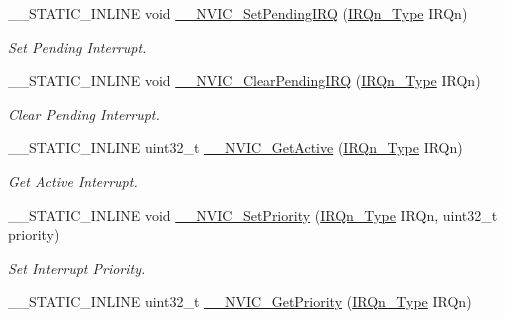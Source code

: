 \begin{DoxyCompactItemize}
\+\_\+\+\_\+\+S\+T\+A\+T\+I\+C\+\_\+\+I\+N\+L\+I\+NE void \hyperlink{group___c_m_s_i_s___core___n_v_i_c_functions_gaabefdd4b790b9a7308929938c0c1e1ad}{\+\_\+\+\_\+\+N\+V\+I\+C\+\_\+\+Set\+Pending\+I\+RQ} (\hyperlink{group___peripheral__interrupt__number__definition_ga7e1129cd8a196f4284d41db3e82ad5c8}{I\+R\+Qn\+\_\+\+Type} I\+R\+Qn)
\begin{DoxyCompactList}\small\item\em Set Pending Interrupt. \end{DoxyCompactList}\item 
\+\_\+\+\_\+\+S\+T\+A\+T\+I\+C\+\_\+\+I\+N\+L\+I\+NE void \hyperlink{group___c_m_s_i_s___core___n_v_i_c_functions_ga562a86dbdf14827d0fee8fdafb04d191}{\+\_\+\+\_\+\+N\+V\+I\+C\+\_\+\+Clear\+Pending\+I\+RQ} (\hyperlink{group___peripheral__interrupt__number__definition_ga7e1129cd8a196f4284d41db3e82ad5c8}{I\+R\+Qn\+\_\+\+Type} I\+R\+Qn)
\begin{DoxyCompactList}\small\item\em Clear Pending Interrupt. \end{DoxyCompactList}\item 
\+\_\+\+\_\+\+S\+T\+A\+T\+I\+C\+\_\+\+I\+N\+L\+I\+NE uint32\+\_\+t \hyperlink{group___c_m_s_i_s___core___n_v_i_c_functions_gaa2837003c28c45abf193fe5e8d27f593}{\+\_\+\+\_\+\+N\+V\+I\+C\+\_\+\+Get\+Active} (\hyperlink{group___peripheral__interrupt__number__definition_ga7e1129cd8a196f4284d41db3e82ad5c8}{I\+R\+Qn\+\_\+\+Type} I\+R\+Qn)
\begin{DoxyCompactList}\small\item\em Get Active Interrupt. \end{DoxyCompactList}\item 
\+\_\+\+\_\+\+S\+T\+A\+T\+I\+C\+\_\+\+I\+N\+L\+I\+NE void \hyperlink{group___c_m_s_i_s___core___n_v_i_c_functions_ga505338e23563a9c074910fb14e7d45fd}{\+\_\+\+\_\+\+N\+V\+I\+C\+\_\+\+Set\+Priority} (\hyperlink{group___peripheral__interrupt__number__definition_ga7e1129cd8a196f4284d41db3e82ad5c8}{I\+R\+Qn\+\_\+\+Type} I\+R\+Qn, uint32\+\_\+t priority)
\begin{DoxyCompactList}\small\item\em Set Interrupt Priority. \end{DoxyCompactList}\item 
\+\_\+\+\_\+\+S\+T\+A\+T\+I\+C\+\_\+\+I\+N\+L\+I\+NE uint32\+\_\+t \hyperlink{group___c_m_s_i_s___core___n_v_i_c_functions_gaeb9dc99c8e7700668813144261b0bc73}{\+\_\+\+\_\+\+N\+V\+I\+C\+\_\+\+Get\+Priority} (\hyperlink{group___peripheral__interrupt__number__definition_ga7e1129cd8a196f4284d41db3e82ad5c8}{I\+R\+Qn\+\_\+\+Type} I\+R\+Qn)

\end{DoxyCompactItemize}
